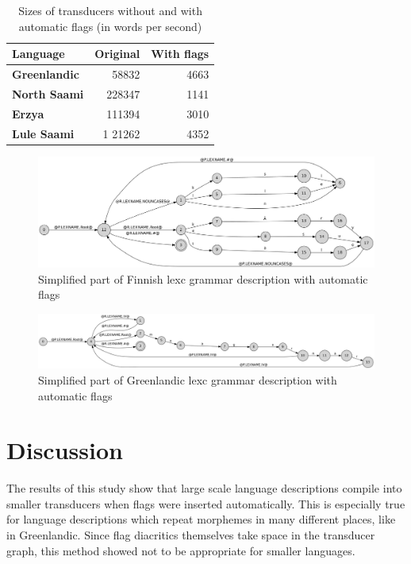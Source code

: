 \documentclass[11pt]{article}
\begin{document}
\begin{table}
    \centering
    \begin{tabular}{|l|r|r|}
        \hline
        \bf Language & \bf Original & \bf With flags \\
        \hline
        \bf Greenlandic & 58832 & 4663\\
        \bf North Saami & 228347  & 1141 \\
        \bf Erzya & 111394  & 3010\\
        \bf Lule Saami & 1 21262 & 4352 \\
        \hline
    \end{tabular}
    \caption{Sizes of transducers without and with automatic flags (in words per second)
    \label{table:speed}}
\end{table}

\begin{figure}
    \includegraphics[width=\textwidth]{transducer.png}
     \caption{Simplified part of Finnish lexc grammar description with automatic flags
     \label{fig:lexc-fin-flag}}
\end{figure}

\begin{figure}
    \includegraphics[width=\textwidth]{gr.png}
     \caption{Simplified part of Greenlandic lexc grammar description with automatic flags
     \label{fig:lexc-gr-flag}}
\end{figure}

\section{Discussion}
\label{sec:discussion}

The results of this study show that large scale language descriptions compile into smaller transducers when flags were inserted automatically. This is especially true for language descriptions which repeat morphemes in many different places, like in Greenlandic. Since flag diacritics themselves take space in the transducer graph, this method showed not to be appropriate for smaller languages.
\end{document}
